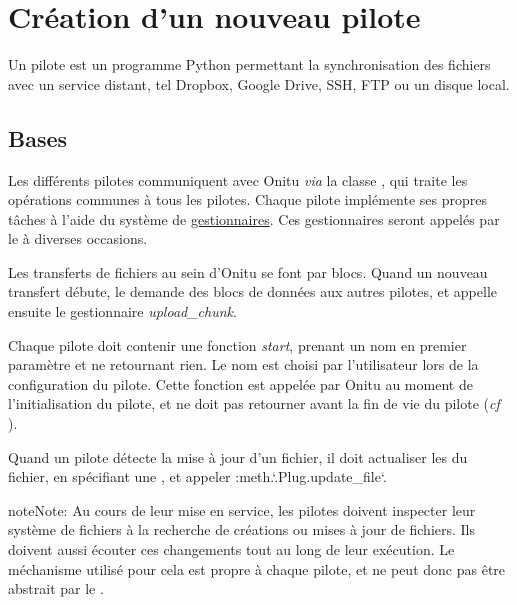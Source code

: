 \documentclass[letterpaper,10pt,english]{sphinxmanual}
\begin{document}
\section{Création d'un nouveau pilote}
\label{drivers:creating-a-new-driver}\label{drivers::doc}
Un pilote est un programme Python permettant la synchronisation des fichiers avec un service distant, tel Dropbox, Google Drive, SSH, FTP ou un disque local.


\subsection{Bases}
\label{drivers:basics}
Les différents pilotes communiquent avec Onitu \emph{via} la classe {\hyperref[drivers:onitu.api.Plug]{}}, qui traite les opérations communes à tous les pilotes. Chaque pilote implémente ses propres tâches à l'aide du système de {\hyperref[drivers:handlers]{gestionnaires}}. Ces gestionnaires seront appelés par le {\hyperref[drivers:onitu.api.Plug]{}} à diverses occasions.

Les transferts de fichiers au sein d'Onitu se font par blocs. Quand un nouveau transfert débute, le {\hyperref[drivers:onitu.api.Plug]{}} demande des blocs de données aux autres pilotes, et appelle ensuite le gestionnaire \emph{upload\_chunk}.

Chaque pilote doit contenir une fonction \emph{start}, prenant un nom en premier paramètre et ne retournant rien. Le nom est choisi par l'utilisateur lors de la configuration du pilote. Cette fonction est appelée par Onitu au moment de l'initialisation du pilote, et ne doit pas retourner avant la fin de vie du pilote (\emph{cf} {\hyperref[drivers:onitu.api.Plug.listen]{}}).

Quand un pilote détecte la mise à jour d'un fichier, il doit actualiser les {\hyperref[drivers:onitu.api.metadata.Metadata]{}} du fichier, en spécifiant une {\hyperref[drivers:onitu.api.metadata.Metadata.revision]{}}, et appeler :meth.{}`.Plug.update\_file{}`.

\begin{notice}{note}{Note:}
Au cours de leur mise en service, les pilotes doivent inspecter leur système de fichiers à la recherche de créations ou mises à jour de fichiers. Ils doivent aussi écouter ces changements tout au long de leur exécution. Le méchanisme utilisé pour cela est propre à chaque pilote, et ne peut donc pas être abstrait par le {\hyperref[drivers:onitu.api.Plug]{}}.
\end{notice}
\end{document}
